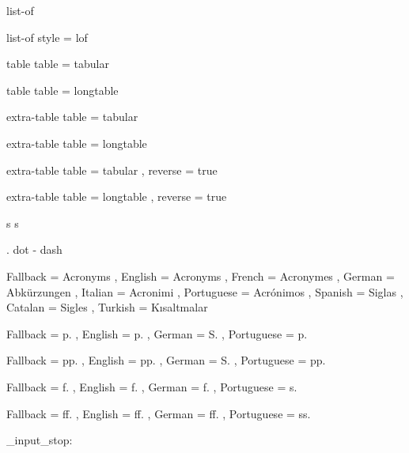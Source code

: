  {list-of}
  { }

 {list-of}
  { style = lof }

 {table}
  { table = tabular }

 {table}
  { table = longtable }

 {extra-table}
  { table = tabular }

 {extra-table}
  { table = longtable }

 {extra-table}
  {
    table   = tabular ,
    reverse = true
  }

 {extra-table}
  {
    table   = longtable ,
    reverse = true
  }

 {s} {s}

\AcroRegisterTrailing . {dot}
\AcroRegisterTrailing - {dash}
\AcroRegisterTrailing {}


  {
    Fallback   = Acronyms ,
    English    = Acronyms ,
    French     = Acronymes ,
    German     = Abk\"urzungen ,
    Italian    = Acronimi ,
    Portuguese = Acr\'onimos ,
    Spanish    = Siglas ,
    Catalan    = Sigles ,
    Turkish    = K\i saltmalar
  }

  {
    Fallback   = p. ,
    English    = p. ,
    German     = S. ,
    Portuguese = p.
  }

  {
    Fallback   = pp. ,
    English    = pp. ,
    German     = S. ,
    Portuguese = pp.
  }

  {
    Fallback   = f. ,
    English    = f. ,
    German     = f. ,
    Portuguese = s.
  }

  {
    Fallback   = ff. ,
    English    = ff. ,
    German     = ff. ,
    Portuguese = ss.
  }

\file_input_stop:
